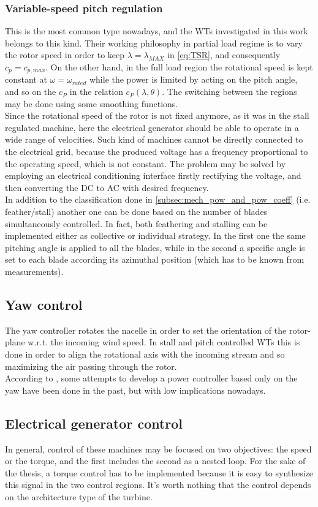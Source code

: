 \subsubsection{Variable-speed pitch regulation}
This is the most common type nowadays, and the \acrshort{WTs} investigated in this work belongs to this kind. Their working philosophy in partial load regime is to vary the rotor speed in order to keep $\lambda = \lambda_{MAX}$ in \autoref{eq:TSR}, and consequently $c_p=c_{p,max}$. On the other hand, in the full load region the rotational speed is kept constant at $\omega = \omega_{rated}$ while the power is limited by acting on the pitch angle, and so on the $c_P$ in the relation $c_P(\lambda, \theta)$. The switching between the regions may be done using some smoothing functions. \\
Since the rotational speed of the rotor is not fixed anymore, as it was in the stall regulated machine, here the electrical generator should be able to operate in a wide range of velocities. Such kind of machines cannot be directly connected to the electrical grid, because the produced voltage has a frequency proportional to the operating speed, which is not constant. The problem may be solved by employing an electrical conditioning interface firstly rectifying the voltage, and then converting the DC to AC with desired frequency. \\
In addition to the classification done in \ref{subsec:mech_pow_and_pow_coeff} (i.e. feather/stall) another one can be done based on the number of blades simultaneously controlled. In fact, both feathering and stalling can be implemented either as collective or individual strategy. In the first one the same pitching angle is applied to all the blades, while in the second a specific angle is set to each blade according its azimuthal position (which has to be known from measurements).

\subsection{Yaw control}
The yaw controller rotates the nacelle in order to set the orientation of the rotor-plane w.r.t. the incoming wind speed. In stall and pitch controlled \acrshort{WTs} this is done in order to align the rotational axis with the incoming stream and so maximizing the air passing through the rotor. \\
According to \cite{Aerodynamics_of_wind_turbines}, some attempts to develop a power controller based only on the yaw have been done in the past, but with low implications nowadays. 

\subsection{Electrical generator control}\label{subsec:PMSM_control}
In general, control of these machines may be focused on two objectives: the speed or the torque, and the first includes the second as a nested loop. For the sake of the thesis, a torque control has to be implemented because it is easy to synthesize this signal in the two control regions. It's worth nothing that the control depends on the architecture type of the turbine. 